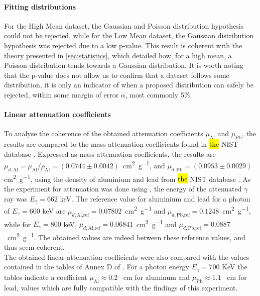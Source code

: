 \paragraph{Fitting distributions}
For the High Mean dataset, the Gaussian and Poisson distribution hypothesis could not be rejected, while for the Low Mean dataset, the Gaussian distribution hypothesis was rejected due to a low p-value. This result is coherent with the theory presented in \autoref{sec:statistics}, which detailed how, for a high mean, a Poisson distribution tends towards a Gaussian distribution. It is worth noting that the p-value does not allow us to confirm that a dataset follows some distribution, it is only an indicator of when a proposed distribution can safely be rejected, within some margin of error \(\alpha\), most commonly 5\%.

\paragraph{Linear attenuation coefficients}
To analyse the coherence of the obtained attenuation coefficients \(\mu_\textrm{Al}\) and \(\mu_\textrm{Pb}\), the results are compared to the mass attenuation coefficients found in \hl{the} NIST database \cite{massic-linear-attenuation}. 
Expressed as mass attenuation coefficients, the results are \linebreak \mbox{\(\mu_{d,\textrm{Al}} = \mu_{\textrm{Al}} / \rho_\textrm{Al} = \left(0.0744 \pm 0.0042\right)\) \si{\centi\meter\squared\per\gram}}, and \(\mu_{d,\textrm{Pb}} = \left(0.0953 \pm 0.0029\right)\) \si{\centi\meter\squared\per\gram}, using the density of aluminium and lead from \hl{the} NIST database \cite{material-density}. 
As the experiment for attenuation was done using \cesium, the energy of the attenuated \(\gamma\) ray was \(E_\gamma = 662\) keV.
The reference value for aluminium and lead for a photon of \(E_\gamma = 600\) keV are \mbox{\(\mu_{d,\textrm{Al,ref}} = 0.07802\) \si{\centi\meter\squared\per\gram}} and \mbox{\(\mu_{d,\textrm{Pb,ref}} = 0.1248\) \si{\centi\meter\squared\per\gram}}, while for \(E_\gamma = 800\) keV, \mbox{\(\mu_{d,\textrm{Al,ref}} = 0.
06841\) \si{\centi\meter\squared\per\gram}} and \linebreak \mbox{\(\mu_{d,\textrm{Pb,ref}} = 0.0887\) \si{\centi\meter\squared\per\gram}}. 
The obtained values are indeed between these reference values, and thus seem coherent. \\
The obtained linear attenuation coefficients were also compared 
with the values contained in the tables of Annex D of \cite{notice_generale}.
For a photon energy $E_{\gamma} = 700$ KeV the tables indicate a coefficient 
$\mu_{\mathrm{Al}} \approx 0.2$ \unit{\per\cm} for aluminum and 
$\mu_{\mathrm{Pb}} \approx 1.1$ \unit{\per\cm} for lead,
values which are fully compatible with the findings of this experiment.

